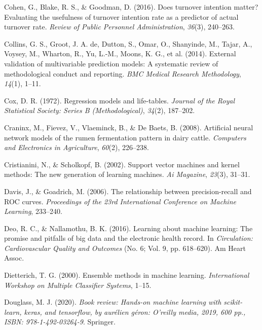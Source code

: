 \documentclass[
  man]{apa7}
\newlength{\cslhangindent}
\newenvironment{CSLReferences}[2] %
 {\begin{list}{}{%
  \setlength{\itemindent}{0pt}
  \setlength{\leftmargin}{0pt}
  \setlength{\parsep}{0pt}
  \ifodd #1
   \setlength{\leftmargin}{\cslhangindent}
   \setlength{\itemindent}{-1\cslhangindent}
  \fi
  \setlength{\itemsep}{#2\baselineskip}}}
 {\end{list}}
\begin{document}
\begin{CSLReferences}{1}{0}
Cohen, G., Blake, R. S., \& Goodman, D. (2016). Does turnover intention matter? Evaluating the usefulness of turnover intention rate as a predictor of actual turnover rate. \emph{Review of Public Personnel Administration}, \emph{36}(3), 240--263.

Collins, G. S., Groot, J. A. de, Dutton, S., Omar, O., Shanyinde, M., Tajar, A., Voysey, M., Wharton, R., Yu, L.-M., Moons, K. G., et al. (2014). External validation of multivariable prediction models: A systematic review of methodological conduct and reporting. \emph{BMC Medical Research Methodology}, \emph{14}(1), 1--11.

Cox, D. R. (1972). Regression models and life-tables. \emph{Journal of the Royal Statistical Society: Series B (Methodological)}, \emph{34}(2), 187--202.

Craninx, M., Fievez, V., Vlaeminck, B., \& De Baets, B. (2008). Artificial neural network models of the rumen fermentation pattern in dairy cattle. \emph{Computers and Electronics in Agriculture}, \emph{60}(2), 226--238.

Cristianini, N., \& Scholkopf, B. (2002). Support vector machines and kernel methods: The new generation of learning machines. \emph{Ai Magazine}, \emph{23}(3), 31--31.

Davis, J., \& Goadrich, M. (2006). The relationship between precision-recall and ROC curves. \emph{Proceedings of the 23rd International Conference on Machine Learning}, 233--240.

Deo, R. C., \& Nallamothu, B. K. (2016). Learning about machine learning: The promise and pitfalls of big data and the electronic health record. In \emph{Circulation: Cardiovascular Quality and Outcomes} (No. 6; Vol. 9, pp. 618--620). Am Heart Assoc.

Dietterich, T. G. (2000). Ensemble methods in machine learning. \emph{International Workshop on Multiple Classifier Systems}, 1--15.

Douglass, M. J. (2020). \emph{Book review: Hands-on machine learning with scikit-learn, keras, and tensorflow, by aur{é}lien g{é}ron: O'reilly media, 2019, 600 pp., ISBN: 978-1-492-03264-9}. Springer.


\end{CSLReferences}
\end{document}

